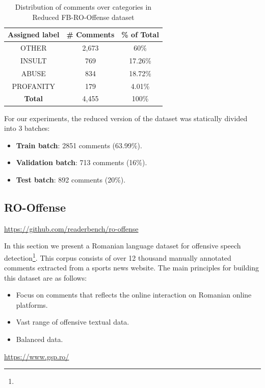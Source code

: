 \documentclass[12pt,a4paper]{report}
\begin{document}
\begin{table}[H]\small\linespread{1}
\centering
\caption{Distribution of comments over categories in Reduced FB-RO-Offense dataset}
\label{tab:distil-fb-ro-distribution}
\begin{tabular}{ | c | c | c | } 
  \hline
  \textbf{Assigned label} &   \textbf{\# Comments} &   \textbf{\% of Total}\\\hline
  OTHER & 2,673 &   60\% \\\hline
  INSULT &   769 &   17.26\% \\\hline
  ABUSE &   834 &   18.72\% \\\hline
  PROFANITY &  179 &   4.01\% \\\hline
  \textbf{Total} &  4,455 &   100\% \\\hline
\end{tabular}
\end{table}

For our experiments, the reduced version of the dataset was statically divided into 3 batches:
\begin{itemize}
    \item \textbf{Train batch}: 2851 comments (63.99\%).
    \item \textbf{Validation batch}: 713 comments (16\%).
    \item \textbf{Test batch}: 892 comments (20\%).
\end{itemize}

\subsection{RO-Offense}
\label{section:RO-Offense}
\urldef{\urlGithubROOffense}\url{https://github.com/readerbench/ro-offense}

In this section we present a Romanian language dataset for offensive speech detection\footnote{\urlGithubROOffense}. This corpus consists of over 12 thousand manually annotated comments extracted from a sports news website. The main principles for building this dataset are as follows:
\begin{itemize}
    \item Focus on comments that reflects the online interaction on Romanian online platforms.
    \item Vast range of offensive textual data.
    \item Balanced data.
\end{itemize}

\urldef{\urlGSP}\url{https://www.gsp.ro/}
\end{document}
